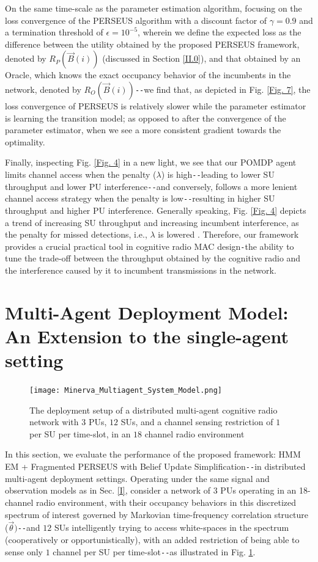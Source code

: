 \documentclass[12pt, draftcls, onecolumn]{IEEEtran}
\begin{document}
On the same time-scale as the parameter estimation algorithm, focusing on the loss convergence of the PERSEUS algorithm with a discount factor of $\gamma{=}0.9$ and a termination threshold of $\epsilon{=}10^{-5}$, wherein we define the expected loss as the difference between the utility obtained by the proposed PERSEUS framework, denoted by $R_{P}(\vec{B}(i))$ (discussed in Section \ref{II.0}), and that obtained by an Oracle, which knows the exact occupancy behavior of the incumbents in the network, denoted by $R_{O}(\vec{B}(i))$\texttt{-{}-}we find that, as depicted in Fig. \ref{Fig. 7}, the loss convergence of PERSEUS is relatively slower while the parameter estimator is learning the transition model; as opposed to after the convergence of the parameter estimator, when we see a more consistent gradient towards the optimality.

Finally, inspecting Fig. \ref{Fig. 4} in a new light, we see that our POMDP agent limits channel access when the penalty ($\lambda$) is high\texttt{-{}-}leading to lower SU throughput and lower PU interference\texttt{-{}-}and conversely, follows a more lenient channel access strategy when the penalty is low\texttt{-{}-}resulting in higher SU throughput and higher PU interference. Generally speaking, Fig. \ref{Fig. 4} depicts a trend of increasing SU throughput and increasing incumbent interference, as the penalty for missed detections, i.e., $\lambda$ is lowered . Therefore, our framework provides a crucial practical tool in cognitive radio MAC design\texttt{-}the ability to tune the trade-off between the throughput obtained by the cognitive radio and the interference caused by it to incumbent transmissions in the network.

\section{Multi-Agent Deployment Model: An Extension to the single-agent setting}\label{Z}
\begin{figure} [htb]
    \centerline{
    \texttt{[image: Minerva\_Multiagent\_System\_Model.png]}}
    \caption{The deployment setup of a distributed multi-agent cognitive radio network with $3$ PUs, $12$ SUs, and a channel sensing restriction of $1$ per SU per time-slot, in an $18$ channel radio environment}
    \label{fig: Z. 0}
\end{figure}
In this section, we evaluate the performance of the proposed framework: HMM EM + Fragmented PERSEUS with Belief Update Simplification\texttt{-{}-}in distributed multi-agent deployment settings. Operating under the same signal and observation models as in Sec. \ref{I}, consider a network of $3$ PUs operating in an 18-channel radio environment, with their occupancy behaviors in this discretized spectrum of interest governed by Markovian time-frequency correlation structure ($\vec{\theta})$\texttt{-{}-}and $12$ SUs intelligently trying to access white-spaces in the spectrum (cooperatively or opportunistically), with an added restriction of being able to sense only $1$ channel per SU per time-slot\texttt{-{}-}as illustrated in Fig. \ref{fig: Z. 0}.
\end{document}
